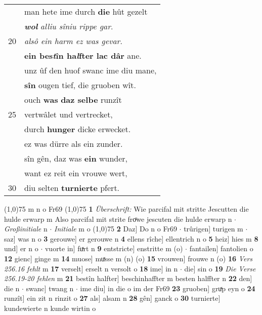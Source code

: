 \documentclass[8pt,a4paper,notitlepage]{article}
\begin{document}
\begin{table}[ht]
\begin{minipage}[t]{0.5\linewidth}
\begin{tabular}{rl}
 & man hete ime durch \textbf{die} hût gezelt\\ 
 & \textbf{\textit{wol}} \textit{alliu sîniu rippe gar}.\\ 
20 & \textit{alsô ein harm ez was gevar}.\\ 
 & \textbf{ein bes\textit{t}în ha\textit{l}fter lac dâr} ane.\\ 
 & unz ûf den huof swanc ime diu mane,\\ 
 & \textbf{sîn} ougen tief, die gruoben wît.\\ 
 & ouch \textbf{was} \textbf{daz selbe} runzît\\ 
25 & vertwâlet und vertrecket,\\ 
 & durch \textbf{hunger} dicke erwecket.\\ 
 & ez was dürre als ein zunder.\\ 
 & sîn gên, daz was \textbf{ein} wunder,\\ 
 & want ez reit ein vrouwe wert,\\ 
30 & diu selten \textbf{turnierte} pfert.\\ 
\end{tabular}
\scriptsize
\line(1,0){75} \newline
m n o Fr69 \newline
\line(1,0){75} \newline
\textbf{1} \textit{Überschrift:} Wie parcifal mit stritte Jescutten die hulde erwarp m  Also parcifal mit strite froͧwe jescuten die hulde erwarp n   $\cdot$ \textit{Großinitiale} n   $\cdot$ \textit{Initiale} m o  \newline
\line(1,0){75} \newline
\textbf{2} Daz] Do n o Fr69  $\cdot$ trûrigen] turigen m  $\cdot$ saz] was n o \textbf{3} gerouwe] er gerouwe n \textbf{4} ellens rîche] ellentrich n o \textbf{5} heiz] hies m \textbf{8} und] er n o  $\cdot$ vuorte in] fuͯrt n \textbf{9} entstricte] enstritte m (o)  $\cdot$ fantailen] fantolien o \textbf{12} gienc] ginge m \textbf{14} muose] muͯsse m (n) (o) \textbf{15} vrouwen] frouwe n (o) \textbf{16} \textit{Vers 256.16 fehlt} m  \textbf{17} verselt] erselt n versolt o \textbf{18} ime] in n  $\cdot$ die] sin o \textbf{19} \textit{Die Verse 256.19-20 fehlen} m  \textbf{21} bestîn halfter] beschinhaffter m besten halffter n \textbf{22} den] die n  $\cdot$ swanc] twang n  $\cdot$ ime diu] in die o im der Fr69 \textbf{23} gruoben] gruͯp eyn o \textbf{24} runzît] ein zit n rinzit o \textbf{27} als] alsam n \textbf{28} gên] ganck o \textbf{30} turnierte] kundewierte n kunde wirtin o \newline
\end{minipage}
\end{table}
\end{document}
